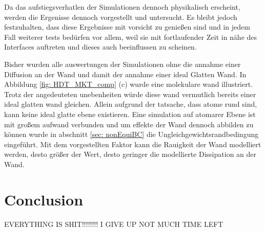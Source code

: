 Da das aufstiegsverhatlen der Simulationen dennoch physikalisch erscheint, werden die Ergenisse dennoch vorgestellt und untersucht. Es bleibt jedoch festzuhalten, dass diese Ergebnisse mit vorsicht zu genießen sind und in jedem Fall weiterer tests bedürfen vor allem, weil sie mit fortlaufender Zeit in nähe des Interfaces auftreten und dieses auch beeinflussen zu scheinen. 

Bisher wurden alle auswertungen der Simulationen ohne die annahme einer Diffusion an der Wand und damit der annahme einer ideal Glatten Wand. In Abbildung \ref{fig: HDT_MKT_comp} (c) wurde eine molekulare wand illustriert. Trotz der angedeuteten unebenheiten würde diese wand vermutlich bereits einer ideal glatten wand gleichen. Allein aufgrund der tatsache, dass atome rund sind, kann keine ideal glatte ebene existieren. Eine simulation auf atomarer Ebene ist mit großem aufwand verbunden und um effekte der Wand dennoch abbilden zu können wurde in abschnitt \ref{sec: nonEquiBC} die Ungleichgewichtsrandbedingung eingeführt. Mit dem vorgestellten Faktor kann die Rauigkeit der Wand modelliert werden, desto größer der Wert, desto geringer die modellierte Dissipation an der Wand. 



\section{Conclusion}

EVERYTHING IS SHIT!!!!!!!!
I GIVE UP 
NOT MUCH TIME LEFT
